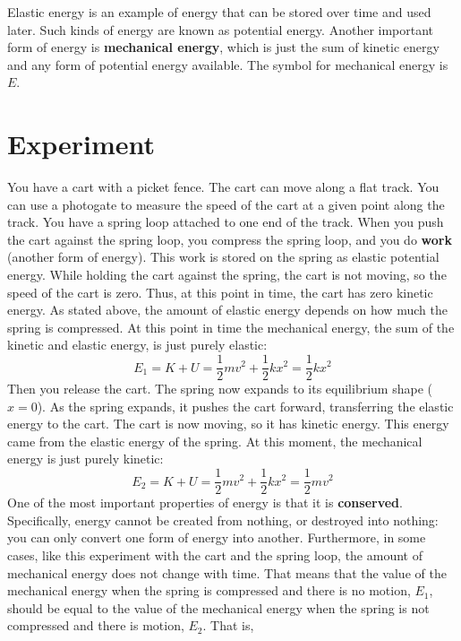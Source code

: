 Elastic energy is an example of energy that can be stored over time and used later. Such kinds of energy are known as potential energy. Another important form of energy is \textbf{mechanical energy}, which is just the sum of kinetic energy and any form of potential energy available. The symbol for mechanical energy is $E$.
%
\section{Experiment}
%
You have a cart with a picket fence. The cart can move along a flat track. You can use a photogate to measure the speed of the cart at a given point along the track. You have a spring loop attached to one end of the track. When you push the cart against the spring loop, you compress the spring loop, and you do \textbf{work} (another form of energy). This work is stored on the spring as elastic potential energy. While holding the cart against the spring, the cart is not moving, so the speed of the cart is zero. Thus, at this point in time, the cart has zero kinetic energy. As stated above, the amount of elastic energy depends on how much the spring is compressed. At this point in time the mechanical energy, the sum of the kinetic and elastic energy, is just purely elastic:
\begin{equation}
    E_{1} = K + U = \frac{1}{2} m v^{2} + \frac{1}{2} k x^{2} = \frac{1}{2} k x^{2}
\end{equation}
Then you release the cart. The spring now expands to its equilibrium shape ($x = 0$). As the spring expands, it pushes the cart forward, transferring the elastic energy to the cart. The cart is now moving, so it has kinetic energy. This energy came from the elastic energy of the spring. At this moment, the mechanical energy is just purely kinetic:
\begin{equation}
    E_{2} = K + U = \frac{1}{2} m v^{2} + \frac{1}{2} k x^{2} = \frac{1}{2} m v^{2}
\end{equation}
One of the most important properties of energy is that it is \textbf{conserved}. Specifically, energy cannot be created from nothing, or destroyed into nothing: you can only convert one form of energy into another. Furthermore, in some cases, like this experiment with the cart and the spring loop, the amount of mechanical energy does not change with time. That means that the value of the mechanical energy when the spring is compressed and there is no motion, $E_{1}$, should be equal to the value of the mechanical energy when the spring is not compressed and there is motion, $E_{2}$. That is,
